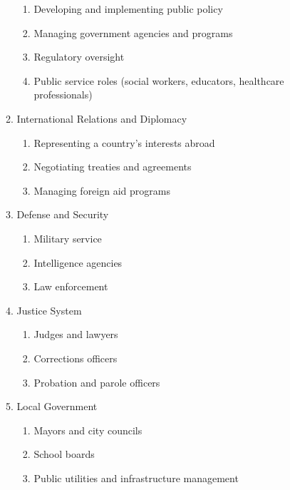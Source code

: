 \begin{enumerate}
\begin{enumerate}
\begin{enumerate}
            \item Developing and implementing public policy
            \item Managing government agencies and programs
            \item Regulatory oversight
            \item Public service roles (social workers, educators, healthcare professionals)
        \end{enumerate}
        \item International Relations and Diplomacy
        \begin{enumerate}
            \item Representing a country's interests abroad
            \item Negotiating treaties and agreements
            \item Managing foreign aid programs
        \end{enumerate}
        \item Defense and Security
        \begin{enumerate}
            \item Military service
            \item Intelligence agencies
            \item Law enforcement
        \end{enumerate}
        \item Justice System
        \begin{enumerate}
            \item Judges and lawyers
            \item Corrections officers
            \item Probation and parole officers
        \end{enumerate}
        \item Local Government
        \begin{enumerate}
            \item Mayors and city councils
            \item School boards
            \item Public utilities and infrastructure management
        \end{enumerate}
    \end{enumerate}
\end{enumerate}